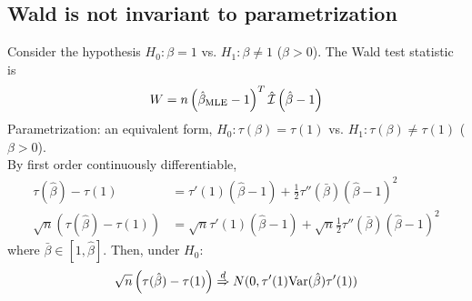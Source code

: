 \documentclass[11pt]{elegantbook}
\begin{document}
\subsection{Wald is not invariant to parametrization}
Consider the hypothesis $H_0:\beta=1$ vs. $H_1:\beta\neq 1$ ($\beta>0$). The Wald test statistic is $$W=n\left(\hat{\beta}_\textnormal{MLE}-1\right)^T \hat{\mathcal{I}} \left(\hat{\beta}-1\right)$$
Parametrization: an equivalent form, $H_0:\tau(\beta)=\tau(1)$ vs. $H_1:\tau(\beta)\neq \tau(1)$ ($\beta>0$).\\
By first order continuously differentiable,
\begin{equation}
    \begin{aligned}
        \tau(\hat{\beta})-\tau(1)&=\tau'(1)(\hat{\beta}-1)+\frac{1}{2}\tau''(\bar{\beta})(\hat{\beta}-1)^2\\
        \sqrt{n}\left(\tau(\hat{\beta})-\tau(1)\right)&=\sqrt{n}\tau'(1)(\hat{\beta}-1)+\sqrt{n}\frac{1}{2}\tau''(\bar{\beta})(\hat{\beta}-1)^2
    \end{aligned}
    \nonumber
\end{equation}
where $\bar{\beta}\in[1,\hat{\beta}]$. Then, under $H_0$:
\begin{equation}
    \begin{aligned}
        \sqrt{n}\left(\tau(\hat{\beta})-\tau(1)\right)\stackrel{d}{\Rightarrow} N(0,\tau'(1)\textnormal{Var}(\hat{\beta})\tau'(1))
    \end{aligned}
    \nonumber
\end{equation}
\end{document}
